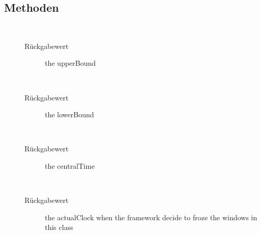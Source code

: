\subsection{Methoden}
\begin{description}
\item[{\label{ontologyFramework.OFDataMapping.ReservatedDataType.AbsoluteTimeWindow.getUpperBound()}}]
~ 
\begin{description}
\item[Rückgabewert] 
the upperBound
\end{description}
\item[{\label{ontologyFramework.OFDataMapping.ReservatedDataType.AbsoluteTimeWindow.getLowerBound()}}]
~ 
\begin{description}
\item[Rückgabewert] 
the lowerBound
\end{description}
\item[{\label{ontologyFramework.OFDataMapping.ReservatedDataType.AbsoluteTimeWindow.getCentralTime()}}]
~ 
\begin{description}
\item[Rückgabewert] 
the centralTime
\end{description}
\item[{\label{ontologyFramework.OFDataMapping.ReservatedDataType.AbsoluteTimeWindow.getActualClock()}}]
~ 
\begin{description}
\item[Rückgabewert] 
the actualClock when the framework decide to froze the windows in this class
\end{description}
\end{description}
